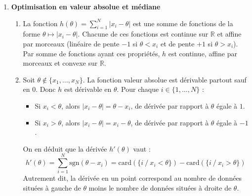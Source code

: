 \documentclass[11pt,a4paper]{article}
\begin{document}
\begin{enumerate}
\begin{enumerate}
        \item \textbf{Interprétation géométrique/intuitive :} Le terme $(x_i - \theta)^2$ représente le carré de la distance euclidienne entre une valeur de la série et un paramètre central $\theta$. Minimiser la somme de ces carrés revient à chercher le point $\theta$ « le plus proche » de toutes les données au sens de la distance quadratique. La moyenne est donc le centre de gravité (ou barycentre) de la distribution.
    \end{enumerate}

    \item \textbf{Optimisation en valeur absolue et médiane}
    \begin{enumerate}
        \item La fonction $h(\theta) = \sum_{i=1}^{N} |x_{i}-\theta|$ est une somme de fonctions de la forme $\theta \mapsto |x_i - \theta|$. Chacune de ces fonctions est continue sur $\mathbb{R}$ et affine par morceaux (linéaire de pente $-1$ si $\theta < x_i$ et de pente $+1$ si $\theta > x_i$). Par somme de fonctions ayant ces propriétés, $h$ est continue, affine par morceaux et convexe sur $\mathbb{R}$.
        
        \item Soit $\theta \notin \{x_1, \dots, x_N\}$. La fonction valeur absolue est dérivable partout sauf en $0$. Donc $h$ est dérivable en $\theta$. Pour chaque $i \in \{1, \dots, N\}$ :
        \begin{itemize}
            \item Si $x_i < \theta$, alors $|x_i - \theta| = \theta - x_i$, de dérivée par rapport à $\theta$ égale à $1$.
            \item Si $x_i > \theta$, alors $|x_i - \theta| = x_i - \theta$, de dérivée par rapport à $\theta$ égale à $-1$.
        \end{itemize}
        On en déduit que la dérivée $h'(\theta)$ vaut :
        \[ h'(\theta) = \sum_{i=1}^{N} \text{sgn}(\theta - x_i) = \text{card}(\{i \ / \ x_i < \theta\}) - \text{card}(\{i \ / \ x_i > \theta\}) \]
        Autrement dit, la dérivée en un point correspond au nombre de données situées à gauche de $\theta$ moins le nombre de données situées à droite de $\theta$.
        

\end{enumerate}
\end{enumerate}
\end{document}
